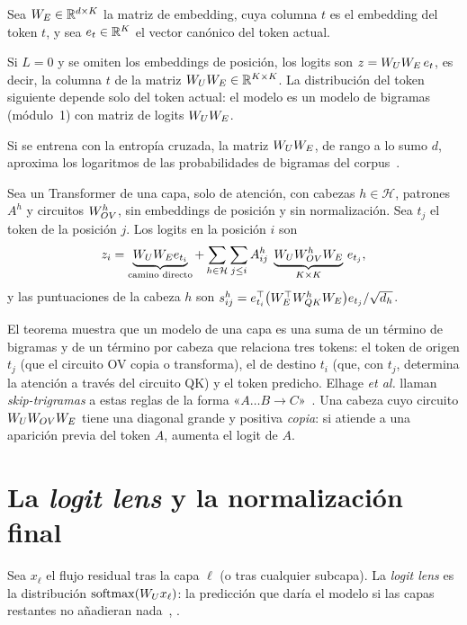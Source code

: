 Sea $W_{E}\in\mathbb{R}^{d\times K}$ la matriz de embedding, cuya columna $t$ es el embedding del token $t$, y sea $e_t\in\mathbb{R}^{K}$ el vector canónico del token actual.

\begin{proposicion}\label{prop:cero}
Si $L=0$ y se omiten los embeddings de posición, los logits son $z=W_{U}W_{E}\,e_t$, es decir, la columna $t$ de la matriz $W_{U}W_{E}\in\mathbb{R}^{K\times K}$. La distribución del token siguiente depende solo del token actual: el modelo es un modelo de bigramas (módulo~1) con matriz de logits $W_{U}W_{E}$.
\end{proposicion}

Si se entrena con la entropía cruzada, la matriz $W_{U}W_{E}$, de rango a lo sumo $d$, aproxima los logaritmos de las probabilidades de bigramas del corpus~\cite[«Zero-Layer Transformers»]{elhage21}.

\begin{teorema}\label{teo:caminos}
Sea un Transformer de una capa, solo de atención, con cabezas $h\in\mathcal{H}$, patrones $A^{h}$ y circuitos $W_{OV}^{h}$, sin embeddings de posición y sin normalización. Sea $t_j$ el token de la posición $j$. Los logits en la posición $i$ son
\[
z_i=\underbrace{W_{U}W_{E} e_{t_i}}_{\text{camino directo}}+\sum_{h\in\mathcal{H}}\sum_{j\le i}A^{h}_{ij}\;\underbrace{W_{U}W_{OV}^{h}W_{E}}_{K\times K}\,e_{t_j},
\]
y las puntuaciones de la cabeza $h$ son $s^{h}_{ij}=e_{t_i}^{\top}\bigl(W_{E}^{\top}W_{QK}^{h}W_{E}\bigr)e_{t_j}/\sqrt{d_h}$.
\end{teorema}

El teorema muestra que un modelo de una capa es una suma de un término de bigramas y de un término por cabeza que relaciona tres tokens: el token de origen $t_j$ (que el circuito OV copia o transforma), el de destino $t_i$ (que, con $t_j$, determina la atención a través del circuito QK) y el token predicho. Elhage \emph{et al.} llaman \emph{skip-trigramas} a estas reglas de la forma «$A\ldots B\to C$»~\cite[«Interpretation as Skip-Trigrams»]{elhage21}. Una cabeza cuyo circuito $W_{U}W_{OV}W_{E}$ tiene una diagonal grande y positiva \emph{copia}: si atiende a una aparición previa del token $A$, aumenta el logit de $A$.

\section{La \emph{logit lens} y la normalización final}
\label{sec:1-norm}

\begin{definicion}\label{def:lens}
Sea $x_\ell$ el flujo residual tras la capa $\ell$ (o tras cualquier subcapa). La \emph{logit lens} es la distribución $\operatorname{softmax}(W_{U} x_\ell)$: la predicción que daría el modelo si las capas restantes no añadieran nada~\cite{nostalgebraist}, \cite[§10.3]{jm3}.
\end{definicion}

